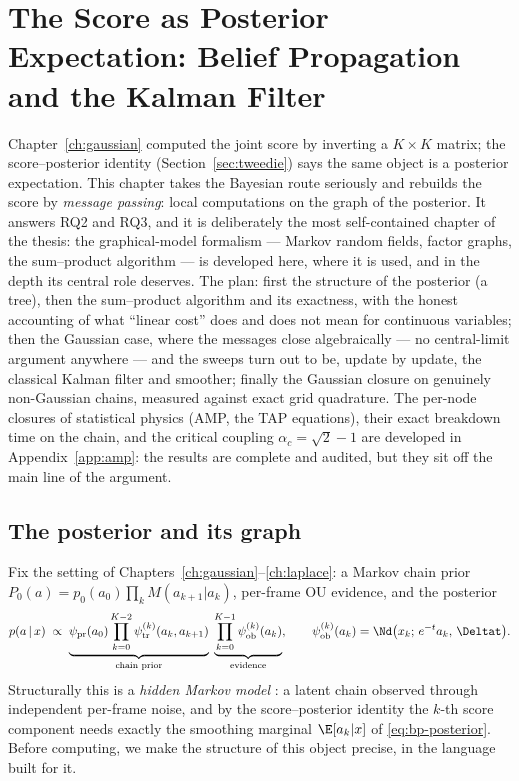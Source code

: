 \chapter{The Score as Posterior Expectation: Belief Propagation and the
Kalman Filter}\label{ch:bp}

Chapter~\ref{ch:gaussian} computed the joint score by inverting a
$K \times K$ matrix; the score--posterior identity
(Section~\ref{sec:tweedie}) says the same object is a posterior
expectation. This chapter takes the Bayesian route seriously and rebuilds
the score by \emph{message passing}: local computations on the graph of
the posterior. It answers RQ2 and RQ3, and it is deliberately the most
self-contained chapter of the thesis: the graphical-model formalism ---
Markov random fields, factor graphs, the sum--product algorithm --- is
developed here, where it is used, and in the depth its central role
deserves. The plan: first the structure of the posterior (a tree), then
the sum--product algorithm and its exactness, with the honest accounting
of what ``linear cost'' does and does not mean for continuous variables;
then the Gaussian case, where the messages close algebraically --- no
central-limit argument anywhere --- and the sweeps turn out to be,
update by update, the classical Kalman filter and smoother; finally the
Gaussian closure on genuinely non-Gaussian chains, measured against exact
grid quadrature. The per-node closures of statistical physics (AMP, the
TAP equations), their exact breakdown time on the chain, and the critical
coupling $\alpha_c = \sqrt{2} - 1$ are developed in
Appendix~\ref{app:amp}: the results are complete and audited, but they
sit off the main line of the argument.

\section{The posterior and its graph}\label{sec:bp-problem}

Fix the setting of Chapters~\ref{ch:gaussian}--\ref{ch:laplace}: a Markov
chain prior $P_0(a) = p_0(a_0) \prod_k M(a_{k+1} | a_k)$, per-frame OU
evidence, and the posterior
\begin{equation}
  p(a \,|\, x) \;\propto\;
  \underbrace{\psi_{\mathrm{pr}}(a_0)
  \prod_{k=0}^{K-2} \psi^{(k)}_{\mathrm{tr}}(a_k, a_{k+1})}_{\text{chain prior}}
  \;
  \underbrace{\prod_{k=0}^{K-1} \psi^{(k)}_{\mathrm{ob}}(a_k)}_{\text{evidence}},
  \qquad
  \psi^{(k)}_{\mathrm{ob}}(a_k) = \Nd\big(x_k;\, e^{-t}a_k,\, \Deltat\big).
  \label{eq:bp-posterior}
\end{equation}
Structurally this is a \emph{hidden Markov model}
\citep{rabiner1989tutorial}: a latent chain observed through independent
per-frame noise, and by the score--posterior identity the $k$-th score
component needs exactly the smoothing marginal $\E[a_k | x]$ of
\eqref{eq:bp-posterior}. Before computing, we make the structure of this
object precise, in the language built for it.

